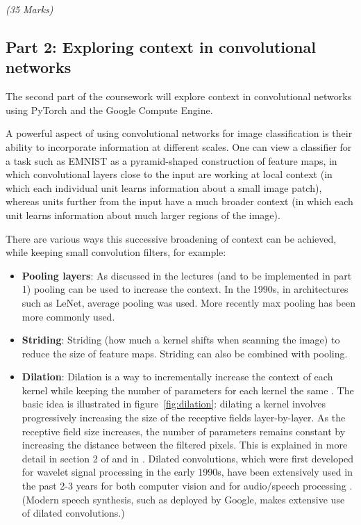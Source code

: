 \documentclass[11pt,]{article}
\begin{document}
\emph{(35 Marks)}

\subsection*{Part 2:   Exploring context in convolutional networks}
\label{sec:pytorch}
The second part of the coursework will explore context in convolutional networks using PyTorch and the Google Compute Engine.

A powerful aspect of using convolutional networks for image classification is their ability to incorporate information at different scales.  One can view a classifier for a task such as EMNIST as a pyramid-shaped construction of feature maps, in which convolutional layers close to the input are working at local context (in which each individual unit learns information about a small image patch), whereas units further from the input have a much broader context (in which each unit learns information about much larger regions of the image).

There are various ways this successive broadening of context can be achieved, while keeping small convolution filters, for example:
\begin{itemize}
    \item \textbf{Pooling layers}: As discussed in the lectures (and to be implemented in part 1) pooling can be used to increase the context.  In the 1990s, in architectures such as LeNet, average pooling was used.  More recently max pooling has been more commonly used.
    \item \textbf{Striding}: Striding (how much a kernel shifts when scanning the image) to reduce the size of  feature maps.  Striding can also be combined with pooling.
    \item \textbf{Dilation}:  Dilation is a way to incrementally increase the context of each kernel while keeping the number of parameters for each kernel the same \citep{yu2016multi}.  The basic idea is illustrated in figure~\ref{fig:dilation}:  dilating a kernel involves progressively increasing the size of the receptive fields layer-by-layer.  As the receptive field size increases, the number of parameters remains constant by increasing the distance between the filtered pixels.  This is explained in more detail in section 2 of \citet{antoniou2018dilated} and in \citet{yu2016multi}. Dilated convolutions, which were first developed for wavelet signal processing in the early 1990s, have been extensively used in the past 2-3 years for both computer vision \citep{yu2016multi} and for audio/speech processing \citep{oord2016wavenet}. (Modern speech synthesis, such as deployed by Google, makes extensive use of dilated convolutions.)
\end{itemize} 
\end{document}
